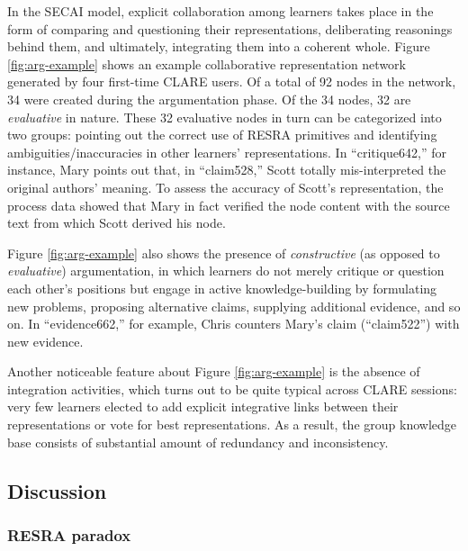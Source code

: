 In the SECAI model, explicit collaboration among learners takes place in
the form of comparing and questioning their representations, deliberating
reasonings behind them, and ultimately, integrating them into a coherent
whole. Figure \ref{fig:arg-example} shows an example collaborative
representation network generated by four first-time CLARE users. Of a total
of 92 nodes in the network, 34 were created during the argumentation phase.
Of the 34 nodes, 32 are {\it evaluative \/} in nature. These 32 evaluative
nodes in turn can be categorized into two groups: pointing out the correct
use of RESRA primitives and identifying ambiguities/inaccuracies in other
learners' representations. In ``critique642,'' for instance, Mary points
out that, in ``claim528,'' Scott totally mis-interpreted the original
authors' meaning. To assess the accuracy of Scott's representation, the
process data showed that Mary in fact verified the node content with the
source text from which Scott derived his node.

Figure \ref{fig:arg-example} also shows the presence of {\it
constructive\/} (as opposed to {\it evaluative\/}) argumentation, in which
learners do not merely critique or question each other's positions but
engage in active knowledge-building by formulating new problems, proposing
alternative claims, supplying additional evidence, and so on. In
``evidence662,'' for example, Chris counters Mary's claim (``claim522'')
with new evidence.

Another noticeable feature about Figure \ref{fig:arg-example} is the
absence of integration activities, which turns out to be quite typical
across CLARE sessions: very few learners elected to add explicit
integrative links between their representations or vote for best
representations. As a result, the group knowledge base consists of
substantial amount of redundancy and inconsistency.

\begin{quotation}
\end{quotation}


\subsection{Discussion}
\label{sec:discussion}

\subsubsection{RESRA paradox}

